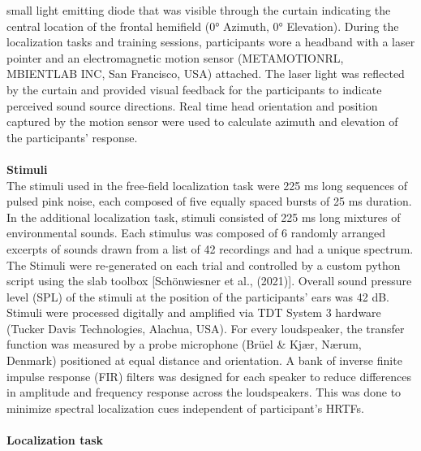 small light emitting diode that was visible through the curtain indicating the central location of the frontal hemifield (0° Azimuth, 0° Elevation). During the localization tasks and training sessions, participants wore a headband with a laser pointer and an electromagnetic motion sensor (METAMOTIONRL, MBIENTLAB INC, San Francisco, USA) attached. The laser light was reflected by the curtain and provided visual feedback for the participants to indicate perceived sound source directions. Real time head orientation and position captured by the motion sensor were used to calculate azimuth and elevation of the participants’ response.\\\\
\textbf{Stimuli}\\
The stimuli used in the free-field localization task were 225 ms long sequences of pulsed pink noise, each composed of five equally spaced bursts of 25 ms duration. In the additional localization task, stimuli consisted of 225 ms long mixtures of environmental sounds. Each stimulus was composed of 6 randomly arranged excerpts of sounds drawn from a list of 42 recordings and had a unique spectrum. The Stimuli were re-generated on each trial and controlled by a custom python script using the slab toolbox [Schönwiesner et al., (2021)]. Overall sound pressure level (SPL) of the stimuli at the position of the participants’ ears was 42 dB. Stimuli were processed digitally and amplified via TDT System 3 hardware (Tucker Davis Technologies, Alachua, USA). For every loudspeaker, the transfer function was measured by a probe microphone (Brüel & Kjær, Nærum, Denmark) positioned at equal distance and orientation. A bank of inverse finite impulse response (FIR) filters was designed for each speaker to reduce differences in amplitude and frequency response across the loudspeakers. This was done to minimize spectral localization cues independent of participant’s HRTFs. \\\\
\textbf{Localization task}\\
